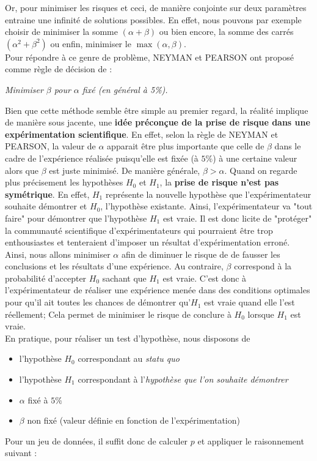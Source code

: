 Or, pour minimiser les risques et ceci, de manière conjointe sur deux paramètres entraine une infinité de solutions possibles. En effet, nous pouvons par exemple choisir de minimiser la somme $(\alpha+\beta)$ ou bien encore, la somme des carrés $(\alpha^{2}+\beta^{2})$ ou enfin, minimiser le $\max(\alpha,\beta)$.\newline
\\
Pour répondre à ce genre de problème, NEYMAN et PEARSON ont proposé comme règle de décision de : 
\begin{center}
\textit{Minimiser $\beta$ pour $\alpha$ fixé (en général à 5\%).}
\end{center}
Bien que cette méthode semble être simple au premier regard, la réalité implique de manière sous jacente, une \textbf{idée préconçue de la prise de risque dans une expérimentation scientifique}. En effet, selon la règle de NEYMAN et PEARSON, la valeur de $\alpha$ apparait être plus importante que celle de $\beta$ dans le cadre de l'expérience réalisée puisqu'elle est fixée (à $5\%$) à une certaine valeur alors que $\beta$ est juste minimisé. De manière générale, $\beta > \alpha$.\newline
Quand on regarde plus précisement les hypothèses $H_{0}$ et $H_{1}$, la \textbf{prise de risque n'est pas symétrique}. En effet, $H_{1}$ représente la nouvelle hypothèse que l'expérimentateur souhaite démontrer et $H_{0}$, l'hypothèse existante. Ainsi, l'expérimentateur va "tout faire" pour démontrer que l'hypothèse $H_{1}$ est vraie.\newline 
Il est donc licite de "protéger" la communauté scientifique d'expérimentateurs qui pourraient être trop enthousiastes et tenteraient d'imposer un résultat d'expérimentation erroné. Ainsi, nous allons minimiser $\alpha$ afin de diminuer le risque de de fausser les conclusions et les résultats d'une expérience.\newline
Au contraire, $\beta$ correspond à la probabilité d'accepter $H_{0}$ sachant que $H_{1}$ est vraie. C'est donc à l'expérimentateur de réaliser une expérience menée dans des conditions optimales pour qu'il ait toutes les chances de démontrer qu'$H_{1}$ est vraie quand elle l'est réellement; Cela permet de minimiser le risque de conclure à $H_{0}$ lorsque $H_{1}$ est vraie.\newline
\\
En pratique, pour réaliser un test d'hypothèse, nous disposons de 
\begin{itemize}
\item l'hypothèse $H_{0}$ correspondant au \textit{statu quo}
\item l'hypothèse $H_{1}$ correspondant à l'\textit{hypothèse que l'on souhaite démontrer}
\item $\alpha$ fixé à $5\%$
\item $\beta$ non fixé (valeur définie en fonction de l'expérimentation)
\end{itemize}
Pour un jeu de données, il suffit donc de calculer $p$ et appliquer le raisonnement suivant : \newline


